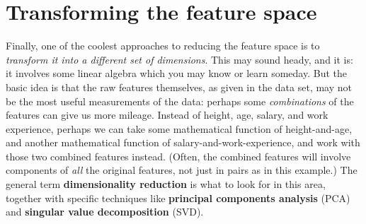 \section{Transforming the feature space}


Finally, one of the coolest approaches to reducing the feature space is to
\textit{transform it into a different set of dimensions}. This may sound
heady, and it is: it involves some linear algebra which you may know or learn
someday. But the basic idea is that the raw features themselves, as given in
the data set, may not be the most useful measurements of the data: perhaps
some \textit{combinations} of the features can give us more mileage. Instead
of height, age, salary, and work experience, perhaps we can take some
mathematical function of height-and-age, and another mathematical function of
salary-and-work-experience, and work with those two combined features instead.
(Often, the combined features will involve components of \textit{all} the
original features, not just in pairs as in this example.) The general term
\textbf{dimensionality reduction} is what to look for in this area, together
with specific techniques like \textbf{principal components analysis} (PCA) and
\textbf{singular value decomposition} (SVD).